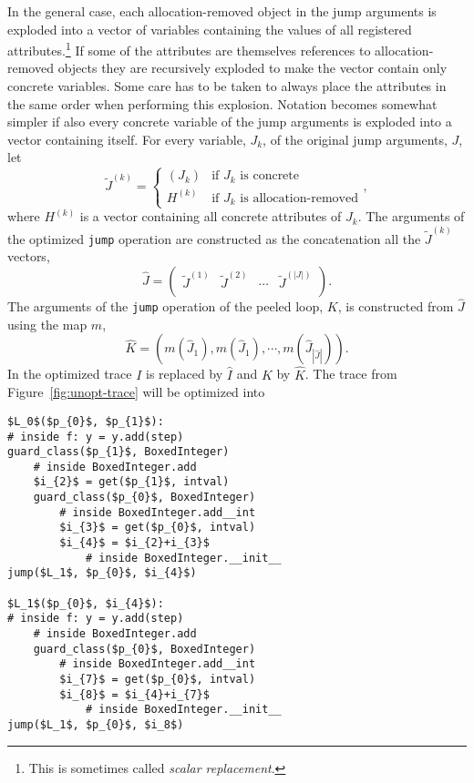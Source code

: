 \documentclass[preprint]{sigplanconf}
\begin{document}
In the general case, each allocation-removed object in the jump arguments is exploded into a
vector of variables containing the values of all registered
attributes.\footnote{This is sometimes called \emph{scalar replacement}.}
If some of the attributes are themselves references to
allocation-removed objects they are recursively exploded
to make the vector contain only concrete variables. Some care has
to be taken to always place the attributes in the same order when
performing this explosion. Notation becomes somewhat simpler if also every
concrete variable of the jump arguments is exploded into a vector containing
itself. For
every variable, $J_k$, of the original jump arguments, $J$, let
\begin{equation}
  \tilde J^{\left(k\right)} = \left\{
      \begin{array}{ll}
        \left(J_k\right)  & \text{if $J_k$ is concrete} \\
        H^{\left(k\right)} & \text{if $J_k$ is allocation-removed}
      \end{array}
  \right.
  ,
\end{equation}
where $H^{\left(k\right)}$ is a vector containing all concrete
attributes of $J_k$. The arguments of the optimized \lstinline{jump}
operation are constructed as the concatenation all the $\tilde J^{\left(k\right)}$ vectors,
\begin{equation}
  \hat J = \left( 
    \begin{array}{cccc}
      \tilde J^{\left(1\right)} & \tilde J^{\left(2\right)} & \cdots &
      \tilde J^{\left(|J|\right)} \\
    \end{array}
  \right)      
  .
\end{equation}
The arguments of the \lstinline{jump} operation of the peeled loop,
$K$, is constructed from $\hat J$ using the map $m$,
\begin{equation}
  \hat K = \left(m\left(\hat J_1\right), m\left(\hat J_1\right), 
                 \cdots, m\left(\hat J_{|\hat J|}\right)\right)
  .
\end{equation}
In the optimized trace $I$ is replaced by $\hat I$ and $K$ by $\hat
K$. The trace from Figure~\ref{fig:unopt-trace} will be optimized into

\begin{lstlisting}[mathescape,numbers = right,basicstyle=\setstretch{1.05}\ttfamily\scriptsize]
$L_0$($p_{0}$, $p_{1}$):
# inside f: y = y.add(step)
guard_class($p_{1}$, BoxedInteger)
    # inside BoxedInteger.add
    $i_{2}$ = get($p_{1}$, intval)
    guard_class($p_{0}$, BoxedInteger)
        # inside BoxedInteger.add__int
        $i_{3}$ = get($p_{0}$, intval)
        $i_{4}$ = $i_{2}+i_{3}$
            # inside BoxedInteger.__init__
jump($L_1$, $p_{0}$, $i_{4}$)

$L_1$($p_{0}$, $i_{4}$):
# inside f: y = y.add(step)
    # inside BoxedInteger.add
    guard_class($p_{0}$, BoxedInteger)
        # inside BoxedInteger.add__int
        $i_{7}$ = get($p_{0}$, intval)
        $i_{8}$ = $i_{4}+i_{7}$
            # inside BoxedInteger.__init__
jump($L_1$, $p_{0}$, $i_8$)
\end{lstlisting}
\end{document}
